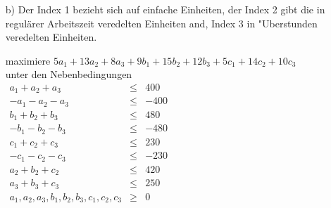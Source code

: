 \documentclass[a4paper,11pt]{article}
\begin{document}
\begin {enumerate}
\begin{enumerate}
        \textbf{Problem 1.2}\\
            maximiere \( -3x_1 + x_2 \)\\
            Substitution 1: \(x_1 = x_1'-x_2''\) mit \(x_1', x_1'' \in \mathbb{N} \) \\
            Substitution 2: \(x_4 = x_4'-x_4''\) mit \(x_4', x_4'' \in \mathbb{N} \) \\
            unter den Nebenbedingungen \\
            \(\begin{array}{rcr}
                x_1 - 6x_2 + x_3 - x_4 & \leq & 3 \\
                7x_2 + 2x_4  &\leq& 5 \\
                - 7x_2 - 2x_4  &\leq& -5 \\
                x_1 + x_2 + x_3 &\leq& 1 \\
                - x_1 - x_2 - x_3 &\leq& -1 \\
                x_3 + x_4 &\leq& 2 \\
                x_1', x_1'', x_2, x_3, x_4', x_4'' &\geq& 0
            \end{array}\)

    \item[b)]
        Der Index 1 bezieht sich auf einfache Einheiten, der Index 2 gibt die
        in regulärer Arbeitszeit veredelten Einheiten and, Index 3 in
        "Uberstunden veredelten Einheiten.

        maximiere \( 5a_1 + 13a_2 + 8a_3 + 9b_1 + 15b_2 + 12b_3 + 5c_1 + 14c_2 + 10c_3 \)\\
        unter den Nebenbedingungen \\
        \(\begin{array}{rcr}
            a_1 + a_2 + a_3 &\leq& 400 \\
            - a_1 - a_2 - a_3 &\leq& -400 \\
            b_1 + b_2 + b_3 &\leq& 480 \\
            - b_1 - b_2 - b_3 &\leq& -480 \\
            c_1 + c_2 + c_3 &\leq& 230 \\
            - c_1 - c_2 - c_3 &\leq& -230 \\
            a_2 + b_2 + c_2 &\leq& 420 \\
            a_3 + b_3 + c_3 &\leq& 250 \\
            a_1, a_2, a_3, b_1, b_2, b_3, c_1, c_2, c_3 &\geq& 0
        \end{array}\)

    \end{enumerate}
\end {enumerate}
\end{document}
